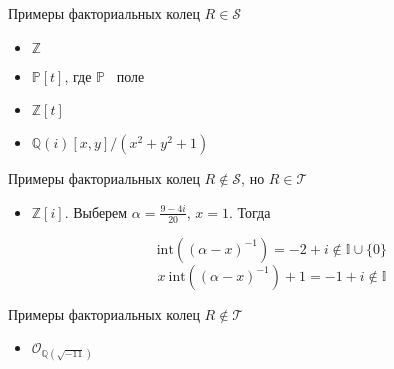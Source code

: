 \documentclass[8pt, xcolor=x11names]{beamer}
\begin{document}
\begin{frame}
    \begin{block}{Примеры факториальных колец $R \in \mathcal{S}$}
        \begin{itemize}
            \item $\mathbb{Z}$
            
            \item $\mathbb{P}[t]$, где $\mathbb{P}$ \textendash\ поле
            
            \item $\mathbb{Z}[t]$
            
            \item $\mathbb{Q}(i)[x, y]/(x^2 + y^2 + 1)$
        \end{itemize}
    \end{block}
    
    \begin{block}{Примеры факториальных колец $R \not\in \mathcal{S}$, но $R \in \mathcal{T}$}
        \begin{itemize}
            \item $\mathbb{Z}[i]$.
            Выберем $\alpha=\frac{9-4i}{20}$, $x=1$.
            Тогда
            
            $$
                \textrm{int}((\alpha-x)^{-1})=-2+i \notin \mathbb{I} \cup \{0\}
            $$
            $$
                x \ \textrm{int}((\alpha-x)^{-1})+1=-1+i \notin \mathbb{I}
            $$
        \end{itemize}
    \end{block}
    
    \begin{block}{Примеры факториальных колец $R \not\in \mathcal{T}$}
        \begin{itemize}
            \item $\mathcal{O}_{\mathbb{Q}(\sqrt{-11})}$
        \end{itemize}
    \end{block}
\end{frame}
\end{document}
